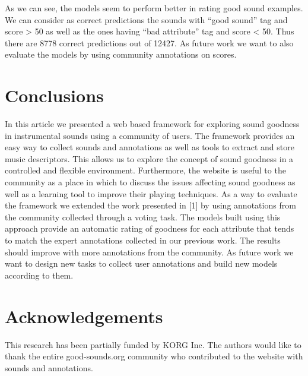 \documentclass{article}
\begin{document}
As we can see, the models seem to perform better in rating good sound examples. We can consider as correct predictions the sounds with “good sound” tag and score > 50 as well as the ones having “bad attribute” tag and score < 50. Thus there are 8778 correct predictions out of 12427. 
As future work we want to also evaluate the models by using community annotations on scores.

\section{Conclusions}
In this article we presented a web based framework for exploring sound goodness in instrumental sounds using a community of users. The framework provides an easy way to collect sounds and annotations as well as tools to extract and store music descriptors. This allows us to explore the concept of sound goodness in a controlled and flexible environment. Furthermore, the website is useful to the community as a place in which to discuss the issues affecting sound goodness as well as a learning tool to improve their playing techniques. 
As a way to evaluate the framework we extended the work presented in [1] by using annotations from the community collected through a voting task. The models built using this approach provide an automatic rating of goodness for each attribute that tends to match the expert annotations collected in our previous work. The results should improve with more annotations from the community.
As future work we want to design new tasks to collect user annotations and build new models according to them. 

\section{Acknowledgements}
This research has been partially funded by KORG Inc. The authors would like to thank the entire good-sounds.org community who contributed to the website with sounds and annotations.

%
\end{document}
